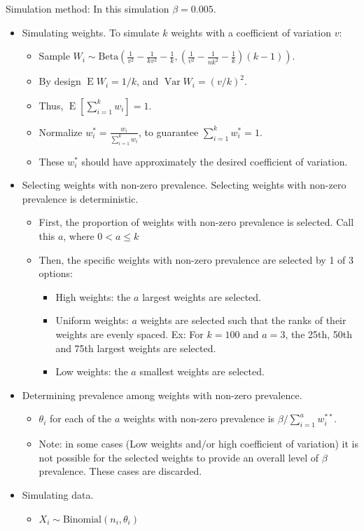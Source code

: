 \documentclass{article}
\DeclareMathOperator{\E}{E}
\DeclareMathOperator{\Var}{Var}
\begin{document}
Simulation method:
In this simulation \( \beta = 0.005 \).
\begin{itemize}
    \item Simulating weights. To simulate \( k \) weights with a coefficient of variation \( v \):
    \begin{itemize}
        \item Sample \( W_i \sim \text{Beta}\left( \frac{1}{v^2} - \frac{1}{kv^2} - \frac{1}{k}, \left( \frac{1}{v^2} - \frac{1}{nk^2} - \frac{1}{k} \right)  (k - 1) \right)\).
        \item By design \( \E W_i = 1 / k \), and  \( \Var W_i = ( v / k )^2  \).
        \item Thus, \( \E \left[ \sum_{i=1}^k w_i \right] = 1\).
        \item Normalize \( w_i^* = \frac{w_i}{\sum_{i=1}^k w_i} \), to guarantee \( \sum_{i=1}^k w_i^* = 1 \).
        \item These \( w_i^* \) should have approximately the desired coefficient of variation.
    \end{itemize}
    \item Selecting weights with non-zero prevalence. Selecting weights with non-zero prevalence is deterministic. 
    \begin{itemize}
        \item First, the proportion of weights with non-zero prevalence is selected. Call this \( a \), where \( 0 < a \leq k \)
        \item Then, the specific weights with non-zero prevalence are selected by 1 of 3 options:
        \begin{itemize}
            \item High weights: the  \( a \) largest weights are selected.
            \item Uniform weights: \( a \) weights are selected such that the ranks of their weights are evenly spaced. Ex: For \( k = 100 \) and \( a = 3 \), the 25th, 50th and 75th largest weights are selected.
            \item Low weights: the  \( a \) smallest weights are selected.
        \end{itemize}
    \end{itemize}
    \item Determining prevalence among weights with non-zero prevalence.
    \begin{itemize}
        \item \( \theta_i \)  for each of the \( a \) weights with non-zero prevalence is \( \beta / \sum_{i=1}^a w_i^{**} \).
        \item Note: in some cases (Low weights and/or high coefficient of variation) it is not possible for the selected weights to provide an overall level of \( \beta \) prevalence. These cases are discarded.
    \end{itemize}
    \item Simulating data.
    \begin{itemize}
        \item \( X_i \sim \text{Binomial}(n_i, \theta_i) \)
    \end{itemize}
\end{itemize}
\end{document}
